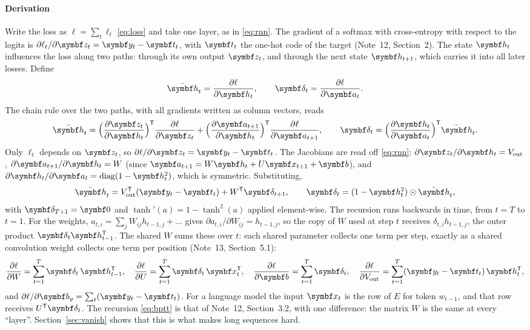 \documentclass[11pt]{article}
\newcommand{\hv}{\vect{h}}
\newcommand{\av}{\vect{a}}
\newcommand{\bv}{\vect{b}}
\newcommand{\yv}{\vect{y}}
\newcommand{\zv}{\vect{z}}
\newcommand{\dv}{\vect{\delta}}
\newcommand{\diag}{\operatorname{diag}}
\begin{document}
\paragraph{Derivation} Write the loss as $\ell = \sum_t \ell_t$ \eqref{eq:loss} and take one layer, as in \eqref{eq:rnn}. The
gradient of a softmax with cross-entropy with respect to the logits is $\partial\ell_t/\partial\zv_t = \yv_t - \vect{t}_t$,
with $\vect{t}_t$ the one-hot code of the target (Note~12, Section~2). The state $\hv_t$ influences the loss along two
paths: through its own output $\zv_t$, and through the next state $\hv_{t+1}$, which carries it into all later losses.
Define
\[
  \bar{\hv}_t = \frac{\partial \ell}{\partial \hv_t}, \qquad \dv_t = \frac{\partial \ell}{\partial \av_t} .
\]
The chain rule over the two paths, with all gradients written as column vectors, reads
\[
  \bar{\hv}_t = \Big(\frac{\partial\zv_t}{\partial\hv_t}\Big)\T\frac{\partial \ell}{\partial\zv_t}
  + \Big(\frac{\partial\av_{t+1}}{\partial\hv_t}\Big)\T\frac{\partial \ell}{\partial\av_{t+1}}, \qquad
  \dv_t = \Big(\frac{\partial\hv_t}{\partial\av_t}\Big)\T\bar{\hv}_t .
\]
Only $\ell_t$ depends on $\zv_t$, so $\partial \ell/\partial\zv_t = \yv_t - \vect{t}_t$. The Jacobians are read off
\eqref{eq:rnn}: $\partial\zv_t/\partial\hv_t = V_{\mathrm{out}}$, $\partial\av_{t+1}/\partial\hv_t = W$ (since
$\av_{t+1} = W\hv_t + U\x_{t+1} + \bv$), and $\partial\hv_t/\partial\av_t = \diag(1 - \hv_t^2)$, which is symmetric.
Substituting,
\begin{equation}\label{eq:bptt}
  \bar{\hv}_t = V_{\mathrm{out}}\T(\yv_t - \vect{t}_t) + W\T\dv_{t+1}, \qquad
  \dv_t = (1 - \hv_t^2) \odot \bar{\hv}_t ,
\end{equation}
with $\dv_{T+1} = \vect{0}$ and $\tanh'(a) = 1 - \tanh^2(a)$ applied element-wise. The recursion runs backwards in time,
from $t = T$ to $t = 1$. For the weights, $a_{t,i} = \sum_j W_{ij}h_{t-1,j} + \dots$ gives
$\partial a_{t,i}/\partial W_{ij} = h_{t-1,j}$, so the copy of $W$ used at step $t$ receives $\delta_{t,i}h_{t-1,j}$, the
outer product $\dv_t\hv_{t-1}\T$. The shared $W$ sums these over $t$: each shared parameter collects one term per step,
exactly as a shared convolution weight collects one term per position (Note~13, Section~5.1):
\begin{equation}\label{eq:bpttgrads}
  \frac{\partial \ell}{\partial W} = \sum_{t=1}^{T} \dv_t\,\hv_{t-1}\T, \quad
  \frac{\partial \ell}{\partial U} = \sum_{t=1}^{T} \dv_t\,\x_t\T, \quad
  \frac{\partial \ell}{\partial \bv} = \sum_{t=1}^{T} \dv_t, \quad
  \frac{\partial \ell}{\partial V_{\mathrm{out}}} = \sum_{t=1}^{T} (\yv_t - \vect{t}_t)\,\hv_t\T ,
\end{equation}
and $\partial \ell/\partial \bv_y = \sum_t(\yv_t - \vect{t}_t)$. For a language model the input $\x_t$ is the row of $E$
for token $w_{t-1}$, and that row receives $U\T\dv_t$. The recursion \eqref{eq:bptt} is that of Note~12,
Section~3.2, with one difference: the matrix $W$ is the same at every ``layer''. Section~\ref{sec:vanish} shows that this
is what makes long sequences hard.
\end{document}
